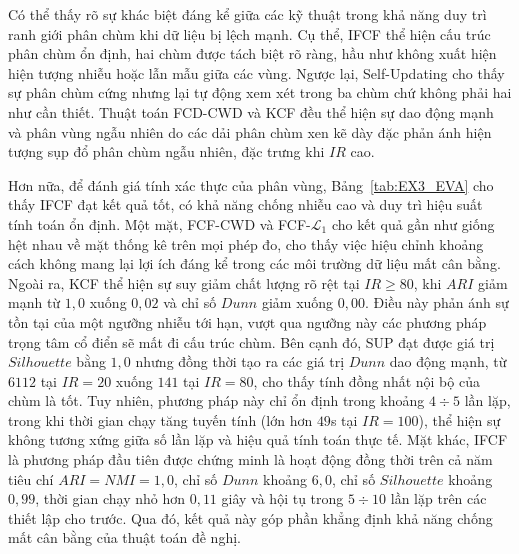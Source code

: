 \documentclass[a4paper,oneside]{book} %
\theoremstyle{plain}
\theoremstyle{plain}
\theoremstyle{nonumberplain}
\begin{document}
Có thể thấy rõ sự khác biệt đáng kể giữa các kỹ thuật trong khả năng duy trì ranh giới phân chùm khi dữ liệu bị lệch mạnh. 
Cụ thể, IFCF thể hiện cấu trúc phân chùm ổn định, hai chùm được tách biệt rõ ràng, hầu như không xuất hiện hiện tượng nhiễu hoặc lẫn mẫu giữa các vùng. Ngược lại, Self-Updating cho thấy sự phân chùm cứng nhưng lại tự động xem xét trong ba chùm chứ không phải hai như cần thiết. Thuật toán FCD-CWD và KCF đều thể hiện sự dao động mạnh và phân vùng ngẫu nhiên do các dải phân chùm xen kẽ dày đặc phản ánh hiện tượng sụp đổ phân chùm ngẫu nhiên, đặc trưng khi $IR$ cao.


Hơn nữa, để đánh giá tính xác thực của phân vùng, Bảng~\ref{tab:EX3_EVA} cho thấy IFCF đạt kết quả tốt, có khả năng chống nhiễu cao và duy trì hiệu suất tính toán ổn định. 
Một mặt, FCF-CWD và FCF-$\mathcal{L}_1$ cho kết quả gần như giống hệt nhau về mặt thống kê trên mọi phép đo, cho thấy việc hiệu chỉnh khoảng cách không mang lại lợi ích đáng kể trong các môi trường dữ liệu mất cân bằng. Ngoài ra, KCF thể hiện sự suy giảm chất lượng rõ rệt tại $IR \ge 80$, khi $ARI$ giảm mạnh từ $1{,}0$ xuống $0{,}02$ và chỉ số $Dunn$ giảm xuống $0{,}00$. Điều này phản ánh sự tồn tại của một ngưỡng nhiễu tới hạn, vượt qua ngưỡng này các phương pháp trọng tâm cổ điển sẽ mất đi cấu trúc chùm.
Bên cạnh đó, SUP đạt được giá trị $Silhouette$ bằng $1{,}0$ nhưng đồng thời tạo ra các giá trị $Dunn$ dao động mạnh, từ $6112$ tại $IR=20$ xuống $141$ tại $IR=80$, cho thấy tính đồng nhất nội bộ của chùm là tốt. Tuy nhiên, phương pháp này chỉ ổn định trong khoảng $4\div5$ lần lặp, trong khi thời gian chạy tăng tuyến tính (lớn hơn $49$s tại $IR=100$), thể hiện sự không tương xứng giữa số lần lặp và hiệu quả tính toán thực tế.
Mặt khác, IFCF là phương pháp đầu tiên được chứng minh là hoạt động đồng thời trên cả năm tiêu chí $ARI=NMI=1{,}0$, chỉ số $Dunn$ khoảng $6{,}0$, chỉ số $Silhouette$ khoảng $0{,}99$, thời gian chạy nhỏ hơn $0{,}11$ giây và hội tụ trong $5\div10$ lần lặp trên các thiết lập cho trước. Qua đó, kết quả này góp phần khẳng định khả năng chống mất cân bằng của thuật toán đề nghị.
\end{document}
